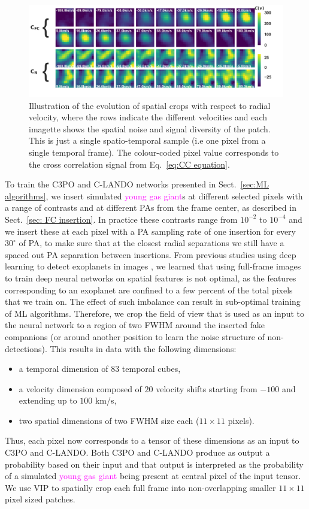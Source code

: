 \documentclass[referee]{aa} %
\newcommand{\newchange}[1]{\textcolor{magenta}{#1}}
\begin{document}
\begin{figure}[t]
    \includegraphics[width=\textwidth]{fig_2_dec2023_aligned_cropped.png}
    \caption{
    Illustration of the evolution of spatial crops with respect to radial velocity, where the rows indicate the different velocities and each imagette shows the spatial noise and signal diversity of the patch. 
    This is just a single spatio-temporal sample (i.e one pixel from a single temporal frame).
    The colour-coded pixel value corresponds to the cross correlation signal from Eq.~\ref{eq:CC equation}. 
    }
    \label{fig:fig-2}
\end{figure}

To train the C3PO and C-LANDO networks presented in Sect.~\ref{sec:ML algorithms}, we insert simulated \newchange{young gas giant}s at different selected pixels with a range of contrasts and at different PAs from the frame center, as described in Sect.~\ref{sec: FC insertion}.
In practice these contrasts range from $10^{-2}$ to $10^{-4}$ and we insert these at each pixel with a PA sampling rate of one insertion for every $30^{\circ}$ of PA, to make sure that at the closest radial separations we still have a spaced out PA separation between insertions. 
From previous studies using deep learning to detect exoplanets in images \citep[e.g.,][]{2018Gomez,2023Carlito}, we learned that using full-frame images to train deep neural networks on spatial features is not optimal, as the features corresponding to an exoplanet are confined to a few percent of the total pixels that we train on. 
The effect of such imbalance can result in sub-optimal training of ML algorithms.
Therefore, we crop the field of view that is used as an input to the neural network to a region of two FWHM around the inserted fake companions (or around another position to learn the noise structure of non-detections).
This results in data with the following dimensions:
\begin{itemize}
    \item a temporal dimension of $83$ temporal cubes, 
    \item a velocity dimension composed of $20$ velocity shifts starting from $-100$ and extending up to $100$ km/s, 
    \item two spatial dimensions of two FWHM size each ($11\times 11$ pixels).
\end{itemize}
Thus, each pixel now corresponds to a tensor of these dimensions as an input to C3PO and C-LANDO.
Both C3PO and C-LANDO produce as output a probability based on their input and that output is interpreted as the probability of a simulated \newchange{young gas giant} being present at central pixel of the input tensor.
We use VIP to spatially crop each full frame into non-overlapping smaller $11\times11$ pixel sized patches.
\end{document}
